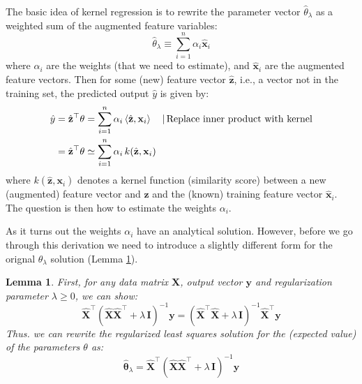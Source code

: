 \documentclass{article}[11pt]
\newtheorem{lemma}{Lemma}
\begin{document}
The basic idea of kernel regression is to rewrite the parameter vector $\hat{\theta}_{\lambda}$ 
as a weighted sum of the augmented feature variables: 
\begin{equation}
\hat{\theta}_{\lambda} \equiv \sum_{i=1}^{n}\alpha_{i}\hat{\mathbf{x}}_{i}
\end{equation}
where $\alpha_{i}$ are the weights (that we need to estimate), and $\hat{\mathbf{x}}_{i}$ are the augmented feature vectors.
Then for some (new) feature vector $\hat{\mathbf{z}}$, i.e., a vector not in the training set, the predicted output $\hat{y}$ is given by:
\begin{align*}
\hat{y} & = \hat{\mathbf{z}}^{\top}\theta = \sum_{i=1}^{n}\alpha_{i}\left<\hat{\mathbf{z}},\mathbf{x}_{i}\right>\quad\text{|\,Replace inner product with kernel}\\
        & = \hat{\mathbf{z}}^{\top}\theta \simeq \sum_{i=1}^{n}\alpha_{i}\,k(\hat{\mathbf{z}},\mathbf{x}_{i})
\end{align*}
where $k(\hat{\mathbf{z}},\mathbf{x}_{i})$ denotes a kernel function (similarity score) between a new (augmented) feature vector and $\hat{\mathbf{z}}$
and the (known) training feature vector $\hat{\mathbf{x}}_{i}$. The question is then how to estimate the weights $\alpha_{i}$.

As it turns out the weights $\alpha_{i}$ have an analytical solution. However, before we go through this derivation
we need to introduce a slightly different form for the orignal $\theta_{\lambda}$ solution (Lemma \ref{lemma:ridge-solution}).

\begin{lemma}\label{lemma:ridge-solution}
   First, for any data matrix $\mathbf{X}$, output vector $\mathbf{y}$ and regularization parameter $\lambda\geq{0}$, we can show:
   \begin{equation*}
   \hat{\mathbf{X}}^{\top}\left(\hat{\mathbf{X}}\hat{\mathbf{X}}^{\top}+\lambda\,\mathbf{I}\right)^{-1}\mathbf{y} = \left(\hat{\mathbf{X}}^{\top}\hat{\mathbf{X}}+\lambda\,\mathbf{I}\right)^{-1}\hat{\mathbf{X}}^{\top}\mathbf{y}
   \end{equation*}
   Thus. we can rewrite the regularized least squares solution for the (expected value) of the parameters $\theta$ as:
   \begin{equation*}
   \hat{\mathbf{\theta}}_{\lambda} = \hat{\mathbf{X}}^{\top}\left(\hat{\mathbf{X}}\hat{\mathbf{X}}^{\top}+\lambda\,\mathbf{I}\right)^{-1}\mathbf{y}
   \end{equation*}
\end{lemma}
\end{document}
